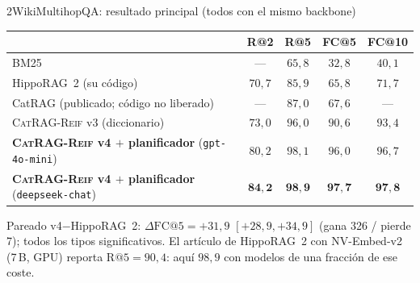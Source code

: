 \documentclass[aspectratio=169,10pt]{beamer}
\newcommand{\sys}{\textsc{CatRAG-Reif}}
\newcommand{\hippo}{HippoRAG~2}
\begin{document}
\begin{frame}{2WikiMultihopQA: resultado principal (todos con el mismo backbone)}
\centering
\small
\begin{tabular}{lcccc}
\toprule
 & R@2 & R@5 & FC@5 & FC@10\\
\midrule
BM25 & --- & $65{,}8$ & $32{,}8$ & $40{,}1$\\
\hippo{} (su código) & $70{,}7$ & $85{,}9$ & $65{,}8$ & $71{,}7$\\
CatRAG (publicado; código no liberado) & --- & $87{,}0$ & $67{,}6$ & ---\\
\sys{} v3 (diccionario) & $73{,}0$ & $96{,}0$ & $90{,}6$ & $93{,}4$\\
\textbf{\sys{} v4 $+$ planificador} (\texttt{gpt-4o-mini}) & $80{,}2$ & $98{,}1$ & $96{,}0$ & $96{,}7$\\
\textbf{\sys{} v4 $+$ planificador} (\texttt{deepseek-chat}) & $\mathbf{84{,}2}$ & $\mathbf{98{,}9}$ & $\mathbf{97{,}7}$ & $\mathbf{97{,}8}$\\
\bottomrule
\end{tabular}

\vspace{2mm}

\scriptsize Pareado v4$-$\hippo{}: $\Delta\mathrm{FC@}5=+31{,}9$ $[+28{,}9,+34{,}9]$
(gana 326 / pierde 7); todos los tipos significativos. El artículo de \hippo{}
con NV-Embed-v2 (7\,B, GPU) reporta $\mathrm{R@}5=90{,}4$: aquí $98{,}9$ con
modelos de una fracción de ese coste.
\end{frame}
\end{document}
